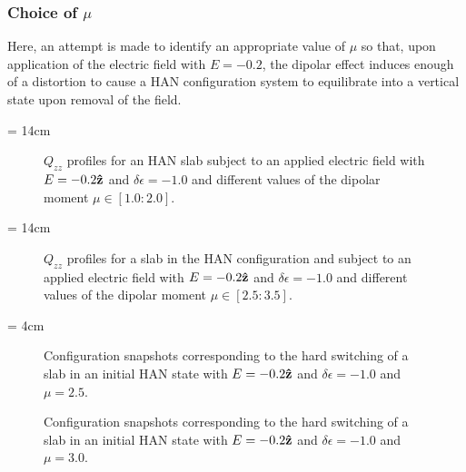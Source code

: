 \subsubsection{Choice of $\mu$}

Here, an attempt is made to identify an appropriate value of $\mu$ so that, upon application of the
electric field with $E=-0.2$, the dipolar effect induces enough of a distortion to cause a 
HAN configuration system to equilibrate into a vertical state upon removal of the field.


\picW = 14cm
\begin{figure}
	\centering
	\caption{$Q_{zz}$ profiles for an HAN slab subject to an applied electric field with
	$E=-0.2\mathbf{\hat{z} }$ and $\delta\epsilon = -1.0$ and different values of the 
	dipolar moment $\mu \in [1.0:2.0]$.}
	\label{fig:hardSwitch_QzzmuInfl01}
\end{figure}

\picW = 14cm
\begin{figure}
	\centering
	\caption{$Q_{zz}$ profiles for a slab in the HAN configuration and 
	subject to an applied electric field with
	$E=-0.2\mathbf{\hat{z} }$ and $\delta\epsilon = -1.0$ and different values of the 
	dipolar moment $\mu \in [2.5:3.5]$.}
	\label{fig:hardSwitch_QzzmuInfl02}
\end{figure}

\picW = 4cm
\begin{figure}
	\centering
	\caption{Configuration snapshots corresponding to the hard switching of a slab in an
	initial HAN state with $E=-0.2\mathbf{\hat{z} }$ and $\delta\epsilon = -1.0$ and $\mu = 2.5$.}
	\label{fig:hardSwitch_snaps2.5}
\end{figure}

\begin{figure}	
	\centering
	\caption{Configuration snapshots corresponding to the hard switching of a slab in an
	initial HAN state with $E=-0.2\mathbf{\hat{z} }$ and $\delta\epsilon = -1.0$ and $\mu = 3.0$.}
	\label{fig:hardSwitch_snaps3.0}
\end{figure}

